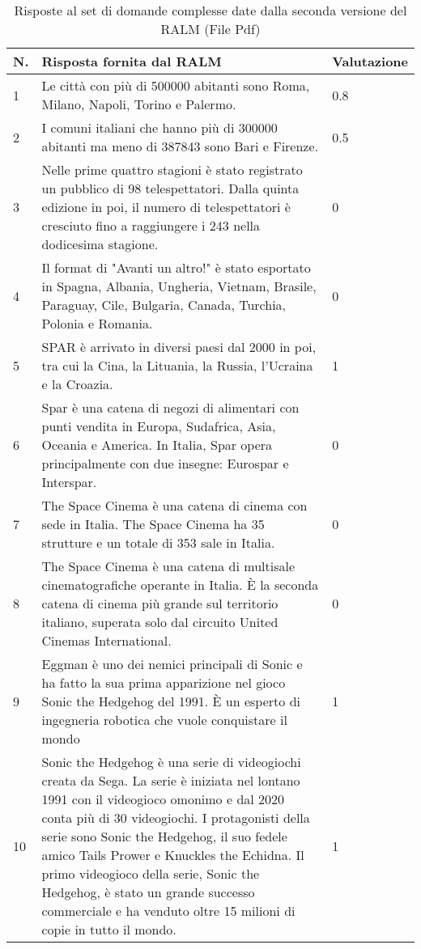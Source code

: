 \begin{table}[H]
    \centering
    \begin{tabular}{|p{0.5cm} |p{6cm} |p{2cm}|}
        \hline
        \textbf{N}. & \textbf{Risposta fornita dal RALM} & \textbf{Valutazione} \\
        \hline
        1 & Le città con più di 500000 abitanti sono Roma, Milano, Napoli, Torino e Palermo. & 0.8 \\
        \hline
        2 & I comuni italiani che hanno più di 300000 abitanti ma meno di 387843 sono Bari e Firenze. & 0.5 \\
        \hline
        3 & Nelle prime quattro stagioni è stato registrato un pubblico di 98 telespettatori. Dalla quinta edizione in poi, il numero di telespettatori è cresciuto fino a raggiungere i 243 nella dodicesima stagione. & 0 \\
        \hline
        4 & Il format di "Avanti un altro!" è stato esportato in Spagna, Albania, Ungheria, Vietnam, Brasile, Paraguay, Cile, Bulgaria, Canada, Turchia, Polonia e Romania. & 0 \\
        \hline
        5 & SPAR è arrivato in diversi paesi dal 2000 in poi, tra cui la Cina, la Lituania, la Russia, l'Ucraina e la Croazia. & 1 \\
        \hline
        6 & Spar è una catena di negozi di alimentari con punti vendita in Europa, Sudafrica, Asia, Oceania e America. In Italia, Spar opera principalmente con due insegne: Eurospar e Interspar. & 0 \\
        \hline
        7 & The Space Cinema è una catena di cinema con sede in Italia. The Space Cinema ha 35 strutture e un totale di 353 sale in Italia. & 0 \\
        \hline
        8 & The Space Cinema è una catena di multisale cinematografiche operante in Italia. È la seconda catena di cinema più grande sul territorio italiano, superata solo dal circuito United Cinemas International. & 0 \\
        \hline
        9 & Eggman è uno dei nemici principali di Sonic e ha fatto la sua prima apparizione nel gioco Sonic the Hedgehog del 1991. È un esperto di ingegneria robotica che vuole conquistare il mondo & 1 \\
        \hline
        10 & Sonic the Hedgehog è una serie di videogiochi creata da Sega. La serie è iniziata nel lontano 1991 con il videogioco omonimo e dal 2020 conta più di 30 videogiochi. I protagonisti della serie sono Sonic the Hedgehog, il suo fedele amico Tails Prower e Knuckles the Echidna. Il primo videogioco della serie, Sonic the Hedgehog, è stato un grande successo commerciale e ha venduto oltre 15 milioni di copie in tutto il mondo. & 1 \\
        \hline
    \end{tabular}
    \caption{Risposte al set di domande complesse date dalla seconda versione del RALM (File Pdf)}
\end{table}

